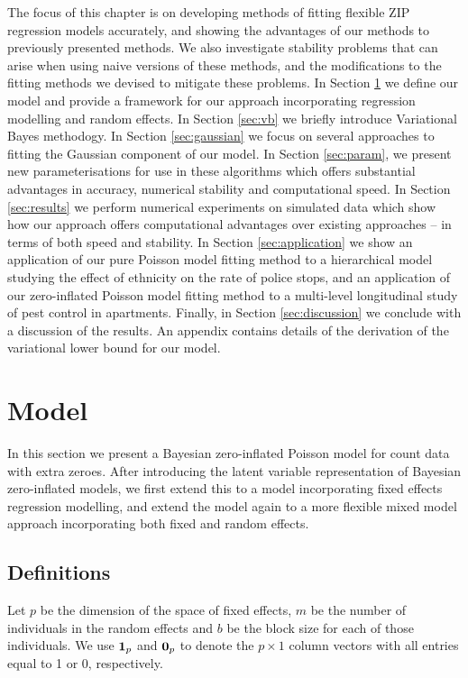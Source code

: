 \documentclass{amsart}[12pt]
\begin{document}
The focus of this chapter is on developing methods of fitting flexible ZIP regression models accurately, and
showing the advantages of our methods to previously presented methods. We also investigate stability problems
that can arise when using naive versions of these methods, and the modifications to the fitting methods we
devised to mitigate these problems. In Section \ref{sec:model} we define our model and provide a framework for
our approach incorporating regression modelling and random effects. In Section \ref{sec:vb} we briefly
introduce Variational Bayes methodogy. In Section \ref{sec:gaussian} we focus on several approaches to fitting
the Gaussian component of our model. In Section \ref{sec:param}, we present new parameterisations for use in
these algorithms which offers substantial advantages in accuracy, numerical stability and computational speed.
In Section \ref{sec:results} we perform numerical experiments on simulated data which show how our approach
offers computational advantages over existing approaches -- in terms of both speed and stability. In Section
\ref{sec:application} we show an application of our pure Poisson model fitting method to a hierarchical model
studying the effect of ethnicity on the rate of police stops, and an application of our zero-inflated Poisson
model fitting method to a multi-level longitudinal study of pest control in apartments. Finally, in Section
\ref{sec:discussion} we conclude with a discussion of the results. An appendix contains details of the
derivation of the variational lower bound for our model.

\section{Model}
\label{sec:model}

In this section we present a Bayesian zero-inflated Poisson model for count data with extra zeroes. After
introducing the latent variable representation of Bayesian zero-inflated models, we first extend this to
a model incorporating fixed effects regression modelling, and extend the model again to a more flexible mixed 
model approach incorporating both fixed and random effects.

\subsection{Definitions}

Let $p$ be the dimension of the space of fixed effects, $m$ be the number of individuals in the random effects
and $b$ be the block size for each of those individuals. We use ${\bf 1}_p$ and ${\bf 0}_p$ to denote the $p
\times 1$ column vectors with all entries equal to 1 or 0, respectively.
\end{document}
